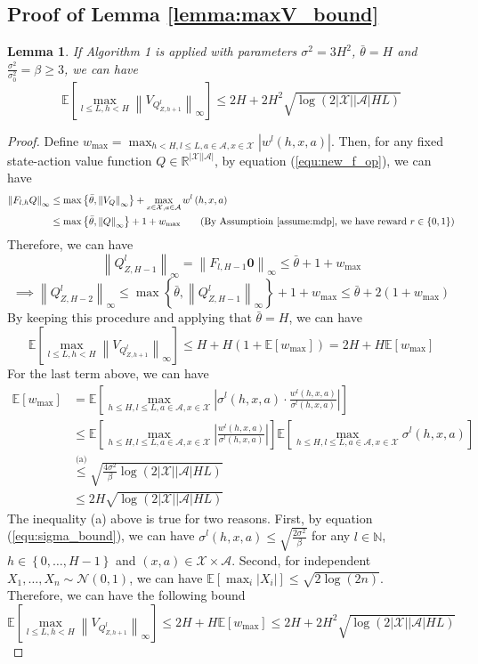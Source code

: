 \documentclass[letterpaper]{article} %
\newcommand{\Sp}[1]{\left(#1\right)}
\newcommand{\Mp}[1]{\left[#1\right]}
\newcommand{\Bp}[1]{\left\{#1\right\}}
\newcommand{\abs}[1]{\left|#1\right|}
\newcommand{\Norm}[1]{\left\|#1\right\|}
\newcommand{\E}{\mathbb{E}}
\newcommand{\R}{\mathbb{R}}
\newcommand{\aX}{\abs{\mathcal{X}}}
\newcommand{\aA}{\abs{\mathcal{A}}}
\newtheorem{lemma}{Lemma}
\theoremstyle{definition}
\begin{document}
\subsection{Proof of Lemma \ref{lemma:maxV_bound}}
\setcounter{lemma}{7}
\begin{lemma}
    If Algorithm 1 is applied with parameters $\sigma^2=3H^2$, $\bar{\theta}=H$ and $\frac{\sigma^2}{\sigma_0^2}=\beta\geq 3$, we can have
	$$\E\Mp{\max_{l\leq L, h< H}\Norm{V_{Q^l_{Z, h+1}}}_{\infty}}\leq 2H+2H^2\sqrt{\log\Sp{2\aX\aA HL}}$$
\end{lemma}
\begin{proof}
    Define $w_{\max}=\max_{h< H, l\leq L, a\in\mathcal{A}, x\in\mathcal{X}}\abs{w^l\Sp{h, x, a}}$. Then, for any fixed state-action value function $Q\in\R^{\aX\aA}$, by equation (\ref{equ:new_f_op}), we can have
    \begin{align*}
        \Norm{F_{l, h}Q}_{\infty}&\leq\max\Bp{\bar{\theta}, \Norm{V_Q}_{\infty}}+\max_{x\in\mathcal{X}, a\in\mathcal{A}}w^l\Sp{h, x, a}\\
        &\leq\max\Bp{\bar{\theta}, \Norm{Q}_{\infty}}+1+w_{\max}\tag{By Assumptioin \ref{assume:mdp}, we have reward $r\in\Bp{0, 1}$}
    \end{align*}
    Therefore, we can have
    $$\Norm{Q_{Z, H-1}^l}_{\infty}=\Norm{F_{l, H-1}\bm{0}}_{\infty}\leq\bar{\theta}+1+w_{\max}$$
    $$\implies\Norm{Q_{Z, H-2}^l}_{\infty}\leq\max\Bp{\bar{\theta}, \Norm{Q^l_{Z, H-1}}_{\infty}}+1+w_{\max}\leq \bar{\theta}+2\Sp{1+w_{\max}}$$
    By keeping this procedure and applying that $\bar{\theta}=H$, we can have
    $$\E\Mp{\max_{l\leq L, h< H}\Norm{V_{Q^l_{Z, h+1}}}_{\infty}}\leq H + H\Sp{1+\E\Mp{w_{\max}}}=2H+H\E\Mp{w_{\max}}$$
    For the last term above, we can have
	\begin{align*}
	\E\Mp{w_{\max}}&=\E\Mp{\max_{h\leq H, l\leq L, a\in\mathcal{A}, x\in\mathcal{X}}\abs{\sigma^l\Sp{h, x, a}\cdot\frac{w^l\Sp{h, x, a}}{\sigma^l\Sp{h, x, a}}}}\\
	&\leq\E\Mp{\max_{h\leq H, l\leq L, a\in\mathcal{A}, x\in\mathcal{X}}\abs{\frac{w^l\Sp{h, x, a}}{\sigma^l\Sp{h, x, a}}}}\E\Mp{\max_{h\leq H, l\leq L, a\in\mathcal{A}, x\in\mathcal{X}}\sigma^l\Sp{h, x, a}}\\
	&\overset{\text{(a)}}{\leq} \sqrt{\frac{4\sigma^2}{\beta}\log\Sp{2\aX\aA HL}}\\
	&\leq 2H\sqrt{\log\Sp{2\aX\aA HL}}\tag{Since $\beta\geq 3$ and $\sigma^2=3H^2$}
	\end{align*}
	The inequality (a) above is true for two reasons. First, by equation (\ref{equ:sigma_bound}), we can have $\sigma^l\Sp{h, x, a}\leq\sqrt{\frac{2\sigma^2}{\beta}}$ for any $l\in\mathbb{N}$, $h\in\Bp{0, \dots, H-1}$ and $\Sp{x, a}\in\mathcal{X}\times\mathcal{A}$. Second, for independent $X_1, \dots, X_n\sim\mathcal{N}\Sp{0, 1}$, we can have $\E\Mp{\max_i\abs{X_i}}\leq\sqrt{2\log \Sp{2n}}$.\\
	Therefore, we can have the following bound
	$$\E\Mp{\max_{l\leq L, h< H}\Norm{V_{Q^l_{Z, h+1}}}_{\infty}}\leq 2H+H\E\Mp{w_{\max}}\leq 2H+2H^2\sqrt{\log\Sp{2\aX\aA HL}}$$
\end{proof}
\end{document}
